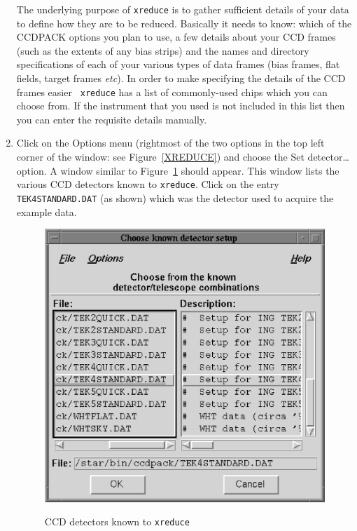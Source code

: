 \documentclass[twoside,11pt]{article}
\begin{document}
\begin{enumerate}
   The underlying purpose of {\tt xreduce} is to gather sufficient details
   of your data to define how they are to be reduced.  Basically it needs
   to know: which of the CCDPACK options you plan to use, a few details
   about your CCD frames (such as the extents of any bias strips) and the
   names and directory specifications of each of your various types of
   data frames (bias frames, flat fields, target frames \emph{etc}).  In
   order to make specifying the details of the CCD frames easier {\tt
   xreduce} has a list of commonly-used chips which you can choose from.
   If the instrument that you used is not included in this list then you
   can enter the requisite details manually.

  \item Click on the {\sf Options} menu (rightmost of the two options in
   the top left corner of the window: see Figure~\ref{XREDUCE}) and
   choose the {\sf Set detector\ldots} option.  A window similar to
   Figure~\ref{SETDETECTOR} should appear.  This window lists the various
   CCD detectors known to {\tt xreduce}.  Click on the entry {\tt
   TEK4STANDARD.DAT} (as shown) which was the detector used to acquire the
   example data.

  \begin{figure}[htbp]
     \centering
      \includegraphics[totalheight=3in]{sc5_setdetector.ps}
      \begin{quote}
      \caption{CCD detectors known to {\tt xreduce}
      \label{SETDETECTOR} }
      \end{quote}
  \end{figure}


\end{enumerate}
\end{document}
